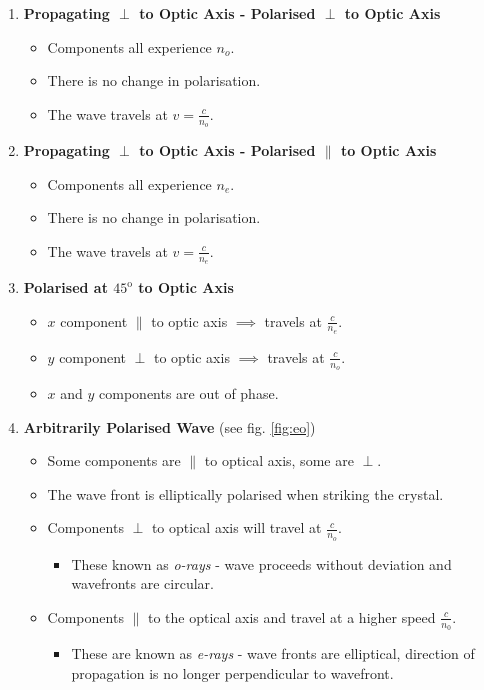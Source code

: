 \documentclass{book}
\begin{document}
{\begin{enumerate}
	\item \textbf{Propagating $\perp$ to Optic Axis - Polarised $\perp$ to Optic Axis}
	\begin{itemize}
		\item Components all experience $n_o$.
		\item There is no change in polarisation.
		\item The wave travels at  $v = \frac{c}{n_o}$.
	\end{itemize}
	\item \textbf{Propagating $\perp$ to Optic Axis - Polarised $\parallel$ to Optic Axis}
	\begin{itemize}
		\item Components all experience $n_e$.
		\item There is no change in polarisation.
		\item The wave travels at  $v = \frac{c}{n_e}$.
	\end{itemize}
	\item \textbf{Polarised at $45^{\text{o}}$ to Optic Axis}
	\begin{itemize}
		\item $x$ component $\parallel$ to optic axis $\implies$ travels at $\frac{c}{n_e}$.
		\item $y$ component $\perp$ to optic axis $\implies$ travels at $\frac{c}{n_o}$.
		\item $x$ and $y$ components are out of phase.
	\end{itemize}
	\item \textbf{Arbitrarily Polarised Wave} (see fig. \ref{fig:eo})
	\begin{itemize}
		\item Some components are $\parallel$ to optical axis, some are $\perp$.
		\item The wave front is elliptically polarised when striking the crystal. 
		\item Components $\perp$ to optical axis will travel at $\frac{c}{n_o}$.
		\begin{itemize}
			\item These known as \textit{o-rays} - wave proceeds without deviation and wavefronts are circular.
		\end{itemize}
		\item Components $\parallel$ to the optical axis and travel at a higher speed $\frac{c}{n_0}$.
		\begin{itemize}
			\item These are known as \textit{e-rays} - wave fronts are elliptical, direction of propagation is no longer perpendicular to wavefront. 

\end{itemize}
\end{itemize}
\end{enumerate}}
\end{document}
